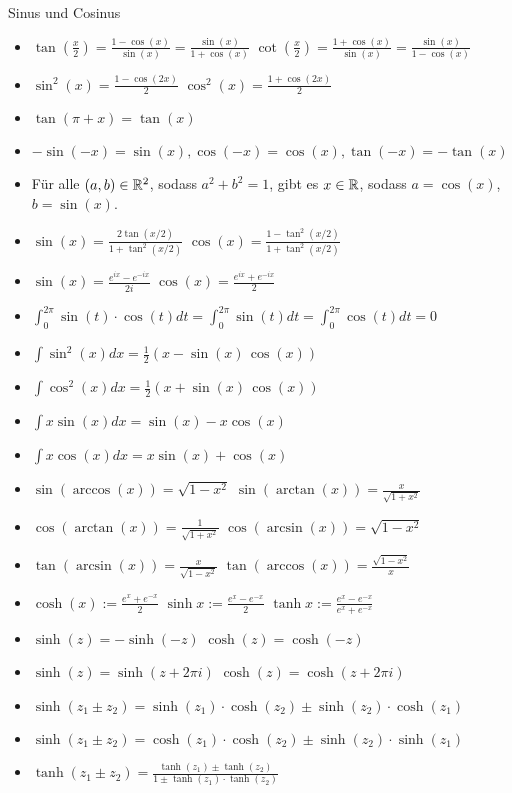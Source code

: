 \begin{Rechenregeln}{Sinus und Cosinus}{}
\begin{itemize}
    \item $\tan(\frac{x}{2}) = \frac{1-\cos(x)}{\sin(x)} = \frac{\sin(x)}{1+\cos(x)}$ \abstand $\cot(\frac{x}{2}) = \frac{1+\cos(x)}{\sin(x)} = \frac{\sin(x)}{1-\cos(x)}$
    \item $\sin^2(x) = \frac{1-\cos(2x)}{2}$
    \abstand $\cos^2(x) = \frac{1+\cos(2x)}{2}$
    \item $\tan(\pi + x) = \tan(x)$
    \item $-\sin(-x) = \sin(x), \cos(-x) = \cos(x), \tan(-x) = -\tan(x)$
    \item Für alle $(a,b)\in \mathbb{R}^2$, sodass $a^2+b^2 = 1$, gibt es $x\in\mathbb{R}$, sodass $a = \cos(x)$, $b = \sin(x)$.
    \item $\sin(x) = \frac{2\tan(x/2)}{1+\tan^2(x/2)}$
    \abstand $\cos(x) = \frac{1-\tan^2(x/2)}{1+\tan^2(x/2)}$
    \item $\sin(x) = \frac{e^{ix} - e^{-ix}}{2i}$
    \abstand $\cos(x) = \frac{e^{ix} + e^{-ix}}{2}$
    \item $\int_0^{2\pi} \sin(t)\cdot \cos(t) dt = \int_0^{2\pi} \sin(t) dt = \int_0^{2\pi} \cos(t) dt = 0$
    \item $\int \sin^2(x) dx = \frac{1}{2} (x-\sin(x) \, \cos(x))$
    \item $\int \cos^2(x) dx = \frac{1}{2} (x+\sin(x) \, \cos(x))$
    \item $\int x \sin(x) dx = \sin (x)-x \cos (x)$
    \item $\int x \cos(x) dx = x \sin (x)+\cos (x)$
    \item \(\sin(\arccos(x)) = \sqrt{1-x^{2}}\) \abstand \(\sin(\arctan(x)) = \frac{x}{\sqrt{1+x^{2}}}\) 
    \item \(\cos(\arctan(x)) = \frac{1}{\sqrt{1+x^{2}}}\) \abstand \(\cos(\arcsin(x)) = \sqrt{1-x^{2}}\) 
    \item \(\tan(\arcsin(x)) = \frac{x}{\sqrt{1-x^{2}}}\) \abstand \(\tan(\arccos(x)) = \frac{\sqrt{1-x^{2}}}{x}\)
    \item $\cosh(x) := \frac{e^x + e^{-x}}{2}$ \abstand $\sinh x := \frac{e^x - e^{-x}}{2}$ \abstand $\tanh x := \frac{e^x - e^{-x}}{e^x + e^{-x}}$
    \item $\sinh(z) = -\sinh(-z)$ \abstand $\cosh(z) = \cosh(-z)$ 
    \item $\sinh(z) = \sinh(z + 2\pi i)$ \abstand $\cosh(z) = \cosh(z+ 2\pi i)$
    \item $\sinh(z_1 \pm z_2) = \sinh(z_1) \cdot \cosh(z_2) \pm \sinh(z_2) \cdot \cosh(z_1)$
    \item $\sinh(z_1 \pm z_2) = \cosh(z_1) \cdot \cosh(z_2) \pm \sinh(z_2) \cdot \sinh(z_1)$
    \item $\tanh(z_1 \pm z_2) = \frac{\tanh(z_1) \pm \tanh(z_2)}{1 \pm \tanh(z_1)\cdot \tanh(z_2)}$
    \end{itemize}
\end{Rechenregeln}

